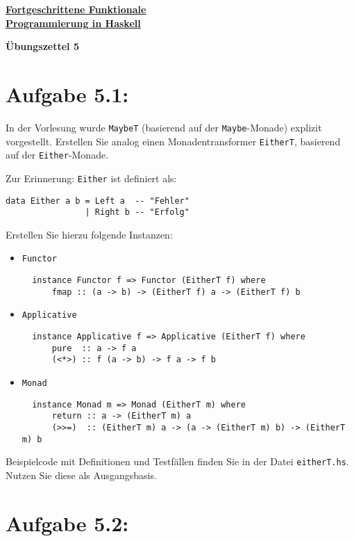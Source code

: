 \documentclass[a4paper,10pt]{scrartcl}
\newcommand{\underfat}[1]{\underline{\textbf{#1}}}
\newcommand{\theuebungszettel}{5}
\begin{document}
\begin{center}
  \begin{huge}
    \underfat{Fortgeschrittene Funktionale}\\
    \underfat{Programmierung in Haskell}\\
  \end{huge}
\begin{LARGE}
\textbf{Übungszettel \theuebungszettel}
\end{LARGE}
\end{center}
\section*{Aufgabe \theuebungszettel.1:}
In der Vorlesung wurde \texttt{MaybeT} (basierend auf der \texttt{Maybe}-Monade) explizit vorgestellt. Erstellen Sie analog einen Monadentransformer \texttt{EitherT}, basierend auf der \texttt{Either}-Monade.\smallskip

Zur Erinnerung: \texttt{Either} ist definiert als:
\begin{verbatim}
data Either a b = Left a  -- "Fehler"
                | Right b -- "Erfolg"
\end{verbatim}
Erstellen Sie hierzu folgende Instanzen:
\begin{itemize}
 \item \texttt{Functor}
       \begin{verbatim}
  instance Functor f => Functor (EitherT f) where
      fmap :: (a -> b) -> (EitherT f) a -> (EitherT f) b
       \end{verbatim}
 \item \texttt{Applicative}
       \begin{verbatim}
  instance Applicative f => Applicative (EitherT f) where
      pure  :: a -> f a
      (<*>) :: f (a -> b) -> f a -> f b
       \end{verbatim}
 \item \texttt{Monad}
       \begin{verbatim}
  instance Monad m => Monad (EitherT m) where
      return :: a -> (EitherT m) a
      (>>=)  :: (EitherT m) a -> (a -> (EitherT m) b) -> (EitherT m) b
       \end{verbatim}
\end{itemize}
Beispielcode mit Definitionen und Testfällen finden Sie in der Datei \texttt{eitherT.hs}. Nutzen Sie diese als Ausgangsbasis.

\section*{Aufgabe \theuebungszettel.2:}
\end{document}

